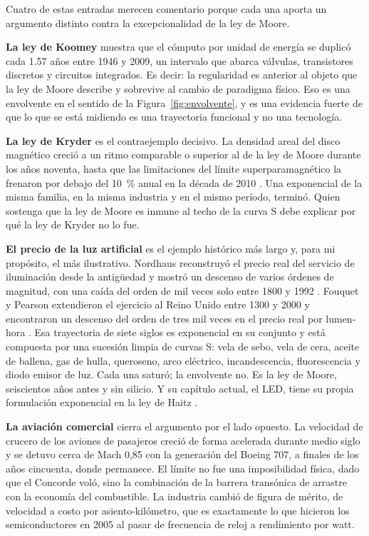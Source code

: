 \documentclass[11pt,letterpaper]{article}
\begin{document}
Cuatro de estas entradas merecen comentario porque cada una aporta un argumento
distinto contra la excepcionalidad de la ley de Moore.

\textbf{La ley de Koomey} \parencite{koomey2011} muestra que el cómputo por
unidad de energía se duplicó cada \num{1.57} años entre 1946 y 2009, un intervalo
que abarca válvulas, transistores discretos y circuitos integrados. Es decir: la
regularidad es anterior al objeto que la ley de Moore describe y sobrevive al
cambio de paradigma físico. Eso es una envolvente en el sentido de la
Figura~\ref{fig:envolvente}, y es una evidencia fuerte de que lo que se está
midiendo es una trayectoria funcional y no una tecnología.

\textbf{La ley de Kryder} es el contraejemplo decisivo. La densidad areal del
disco magnético creció a un ritmo comparable o superior al de la ley de Moore
durante los años noventa, hasta que las limitaciones del límite superparamagnético
la frenaron por debajo del \SI{10}{\percent} anual en la década de 2010
\parencite{fontana2018}. Una exponencial de la misma familia, en la misma
industria y en el mismo período, terminó. Quien sostenga que la ley de Moore es
inmune al techo de la curva S debe explicar por qué la ley de Kryder no lo fue.

\textbf{El precio de la luz artificial} es el ejemplo histórico más largo y, para
mi propósito, el más ilustrativo. Nordhaus reconstruyó el precio real del
servicio de iluminación desde la antigüedad y mostró un descenso de varios
órdenes de magnitud, con una caída del orden de mil veces solo entre 1800 y 1992
\parencite{nordhaus1996}. Fouquet y Pearson extendieron el ejercicio al Reino
Unido entre 1300 y 2000 y encontraron un descenso del orden de tres mil veces en
el precio real por lumen-hora \parencite{fouquet2006}. Esa trayectoria de siete
siglos es exponencial en su conjunto y está compuesta por una sucesión limpia de
curvas S: vela de sebo, vela de cera, aceite de ballena, gas de hulla, queroseno,
arco eléctrico, incandescencia, fluorescencia y diodo emisor de luz. Cada una
saturó; la envolvente no. Es la ley de Moore, seiscientos años antes y sin
silicio. Y su capítulo actual, el LED, tiene su propia formulación exponencial en
la ley de Haitz \parencite{haitz2011}.

\textbf{La aviación comercial} cierra el argumento por el lado opuesto. La
velocidad de crucero de los aviones de pasajeros creció de forma acelerada
durante medio siglo y se detuvo cerca de Mach 0,85 con la generación del Boeing
707, a finales de los años cincuenta, donde permanece. El límite no fue una
imposibilidad física, dado que el Concorde voló, sino la combinación de la
barrera transónica de arrastre con la economía del combustible. La industria
cambió de figura de mérito, de velocidad a costo por asiento-kilómetro, que es
exactamente lo que hicieron los semiconductores en 2005 al pasar de frecuencia de
reloj a rendimiento por watt.
\end{document}
